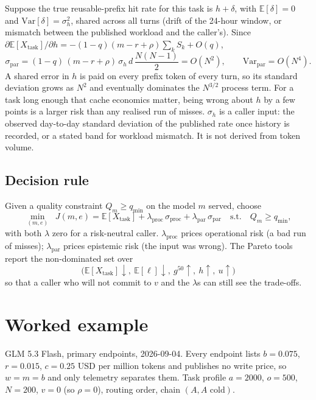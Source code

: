\documentclass[11pt]{article}
\newcommand{\E}{\mathbb{E}}
\newcommand{\Var}{\mathrm{Var}}
\begin{document}
Suppose the true reusable-prefix hit rate for this task is $h + \delta$, with
$\E[\delta] = 0$ and $\Var[\delta] = \sigma_h^2$, shared across all turns
(drift of the 24-hour window, or mismatch between the published workload and
the caller's). Since $\partial \E[X_{\text{task}}] / \partial h =
-(1-q)(m-r+\rho)\sum_k S_k + O(q)$,
\begin{equation}\label{eq:var-param}
  \sigma_{\text{par}} = (1-q)\,(m-r+\rho)\,\sigma_h\, d\,\frac{N(N-1)}{2} = O(N^2),
  \qquad
  \Var_{\text{par}} = O(N^4).
\end{equation}
A shared error in $h$ is paid on every prefix token of every turn, so its
standard deviation grows as $N^2$ and eventually dominates the $N^{3/2}$ process
term. For a task long enough that cache economics matter, being wrong about
$h$ by a few points is a larger risk than any realised run of misses.
$\sigma_h$ is a caller input: the observed day-to-day standard deviation of
the published rate once history is recorded, or a stated band for workload
mismatch. It is not derived from token volume.

\subsection{Decision rule}

Given a quality constraint $Q_m \ge q_{\min}$ on the model $m$ served, choose
\begin{equation}\label{eq:decision}
  \min_{(m, e)} \;\;
  J(m, e) = \E[X_{\text{task}}] + \lambda_{\text{proc}}\, \sigma_{\text{proc}} + \lambda_{\text{par}}\, \sigma_{\text{par}}
  \quad \text{s.t.} \quad Q_m \ge q_{\min},
\end{equation}
with both $\lambda$ zero for a risk-neutral caller. $\lambda_{\text{proc}}$
prices operational risk (a bad run of misses); $\lambda_{\text{par}}$ prices
epistemic risk (the input was wrong). The Pareto tools report the non-dominated
set over
\[
  \big(\E[X_{\text{task}}] \downarrow,\ \E[\ell] \downarrow,\ g^{50} \uparrow,\ h \uparrow,\ u \uparrow\big)
\]
so that a caller who will not commit to $v$ and the $\lambda$s can still see
the trade-offs.

\section{Worked example}

GLM 5.3 Flash, primary endpoints, 2026-09-04. Every endpoint lists
$b = 0.075$, $r = 0.015$, $c = 0.25$ USD per million tokens and publishes no
write price, so $w = m = b$ and only telemetry separates them. Task profile
$a = 2000$, $o = 500$, $N = 200$, $v = 0$ (so $\rho = 0$), routing
\textsf{order}, chain $(A, A\text{ cold})$.
\end{document}
